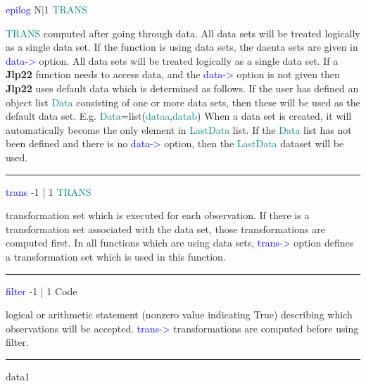 {\noindent \textcolor{blue}{epilog} \tabto{3cm} N|1 \tabto{5cm}  \textcolor{teal}{TRANS}  \tabto{7cm} 
\begin{changemargin}{3cm}{0cm} 
\noindent \textcolor{teal}{TRANS} computed after going through data. 
All data sets will be 
treated logically as a single data set. 
If the function is using data sets, the daenta sets are given in \textcolor{blue}{data->} option. All data sets will be 
treated logically as a single data set. If a \textbf{Jlp22} function needs to access data, and the \textcolor{blue}{data->} 
option is not given then \textbf{Jlp22} uses default data which is determined as follows. 
If the user has defined an object list \textcolor{teal}{Data} consisting of one or more data sets, then these will 
be used as the default data set. E.g. 
\textcolor{teal}{Data}=\textcolor{VioletRed}{list}(\textcolor{teal}{dataa},\textcolor{teal}{datab}) 
When a data set is created, it will automatically become the only element in \textcolor{teal}{LastData} list. If 
the \textcolor{teal}{Data} list has not been defined and there is no \textcolor{blue}{data->} option, then the \textcolor{teal}{LastData} dataset 
will be used. 
\end{changemargin} 
\vspace{0.3cm} 
\hrule 
\vspace{0.3cm} 
\noindent \textcolor{blue}{trans}  \tabto{3cm} -1 | 1 \tabto{5cm}  \textcolor{teal}{TRANS} \tabto{7cm} 
\begin{changemargin}{3cm}{0cm} 
\noindent 	transformation set which is executed for each observation. If there is a transformation set associated with the data set, those transformations are computed first. 
In all functions which are using data sets, \textcolor{blue}{trans->} option defines a 
transformation set which is used in this function. 
\end{changemargin} 
\vspace{0.3cm} 
\hrule 
\vspace{0.3cm} 
\noindent \textcolor{blue}{filter}  \tabto{3cm} -1 | 1 \tabto{5cm}  Code \tabto{7cm} 
\begin{changemargin}{3cm}{0cm} 
\noindent  logical or arithmetic statement (nonzero value indicating True) describing which observations will be accepted. \textcolor{blue}{trans->} transformations are computed before using filter. 
\end {changemargin} 
\hrule 
\vspace{0.2cm} 
\singlespacing 
\begin{example}[comoptex]data1\\ 

\end{example}}
